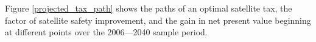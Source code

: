 \documentclass[12pt]{article}
\begin{document}
%
%


Figure \ref{projected_tax_path} shows the paths of an optimal satellite tax, the factor of satellite safety improvement, and the gain in net present value beginning at different points over the 2006---2040 sample period.
\end{document}
